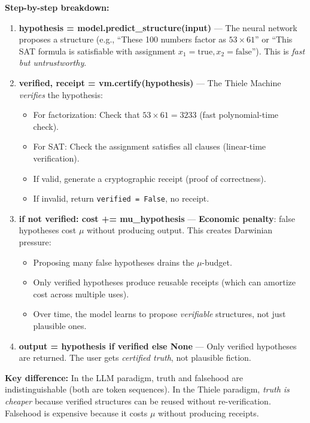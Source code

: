 \textbf{Step-by-step breakdown:}
\begin{enumerate}
    \item \textbf{hypothesis = model.predict\_structure(input)} — The neural network proposes a structure (e.g., ``These 100 numbers factor as $53 \times 61$'' or ``This SAT formula is satisfiable with assignment $x_1 = \text{true}, x_2 = \text{false}$''). This is \textit{fast but untrustworthy}.
    
    \item \textbf{verified, receipt = vm.certify(hypothesis)} — The Thiele Machine \textit{verifies} the hypothesis:
    \begin{itemize}
        \item For factorization: Check that $53 \times 61 = 3233$ (fast polynomial-time check).
        \item For SAT: Check the assignment satisfies all clauses (linear-time verification).
        \item If valid, generate a cryptographic receipt (proof of correctness).
        \item If invalid, return \texttt{verified = False}, no receipt.
    \end{itemize}
    
    \item \textbf{if not verified: cost += mu\_hypothesis} — \textbf{Economic penalty}: false hypotheses cost $\mu$ without producing output. This creates Darwinian pressure:
    \begin{itemize}
        \item Proposing many false hypotheses drains the $\mu$-budget.
        \item Only verified hypotheses produce reusable receipts (which can amortize cost across multiple uses).
        \item Over time, the model learns to propose \textit{verifiable} structures, not just plausible ones.
    \end{itemize}
    
    \item \textbf{output = hypothesis if verified else None} — Only verified hypotheses are returned. The user gets \textit{certified truth}, not plausible fiction.
\end{enumerate}

\textbf{Key difference:} In the LLM paradigm, truth and falsehood are indistinguishable (both are token sequences). In the Thiele paradigm, \textit{truth is cheaper} because verified structures can be reused without re-verification. Falsehood is expensive because it costs $\mu$ without producing receipts.

